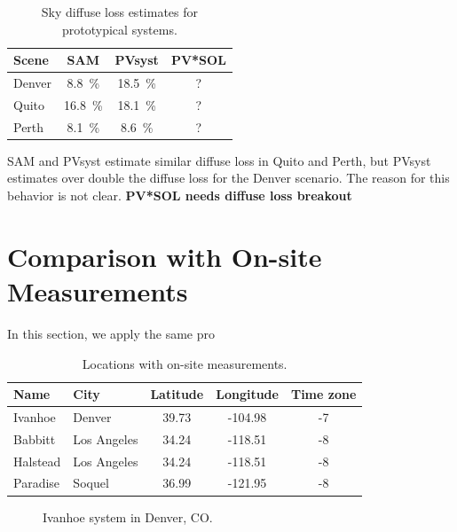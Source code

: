 \documentclass[twocolumn,10pt]{asme2ej}
\begin{document}
\begin{table}[h!]
\begin{center}
\begin{tabular}{lccc}
Scene & SAM & PVsyst & PV*SOL \\
\hline
Denver & 8.8~\% & 18.5~\% & ? \\
Quito  & 16.8~\% & 18.1~\% & ? \\
Perth  & 8.1~\% & 8.6~\% & ? \\
\end{tabular}
\caption{Sky diffuse loss estimates for prototypical systems.}
\label{tab:diffuse_loss}
\end{center}
\end{table}

SAM and PVsyst estimate similar diffuse loss in Quito and Perth, but PVsyst estimates over double the diffuse loss for the Denver scenario.  The reason for this behavior is not clear.  \textbf{PV*SOL needs diffuse loss breakout}



\section{Comparison with On-site Measurements}

In this section, we apply the same pro

\begin{table}[h!]
\begin{center}
\begin{tabular}{llccc}
Name & City & Latitude & Longitude & Time zone \\
\hline
Ivanhoe & Denver & 39.73 & -104.98 & -7 \\
Babbitt & Los Angeles & 34.24 & -118.51 & -8 \\
Halstead & Los Angeles & 34.24 & -118.51 & -8 \\
Paradise & Soquel & 36.99 & -121.95 & -8 \\
\end{tabular}
\caption{Locations with on-site measurements.}
\label{tab:suneye}
\end{center}
\end{table}


\begin{figure}[h!]
\begin{center}
\end{center}
\caption{Ivanhoe system in Denver, CO.}
\label{fig:ivanhoe}
\end{figure}
\end{document}
